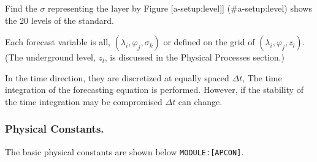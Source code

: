 Find the \(\sigma\) representing the layer by Figure
{[}a-setup:level{]}{]} (\#a-setup:level) shows the 20 levels of the
standard.

Each forecast variable is all, \((\lambda_i, \varphi_j, \sigma_k)\) or
defined on the grid of \((\lambda_i, \varphi_j, z_l)\). (The underground
level, \(z_l\), is discussed in the Physical Processes section.)

In the time direction, they are discretized at equally spaced
\(\Delta t\), The time integration of the forecasting equation is
performed. However, if the stability of the time integration may be
compromised \(\Delta t\) can change.

\hypertarget{physical-constants.}{%
\subsubsection{Physical Constants.}\label{physical-constants.}}

The basic physical constants are shown below
\texttt{MODULE:{[}APCON{]}}.


